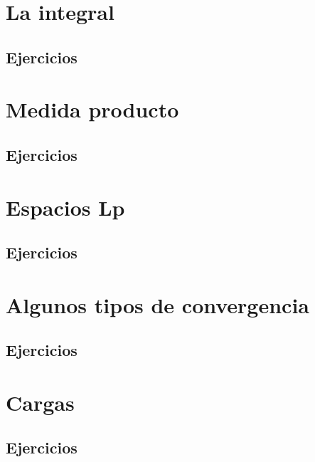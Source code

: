 \documentclass[spanish,12pt,a4paper,openany]{book}
\begin{document}
	\chapter{La integral}
	\section{Ejercicios}
	\chapter{Medida producto}
	\section{Ejercicios}
	\chapter{Espacios Lp}
	\section{Ejercicios}
	\chapter{Algunos tipos de convergencia}
	\section{Ejercicios}
	\chapter{Cargas}
	\section{Ejercicios}
	
\end{document}
